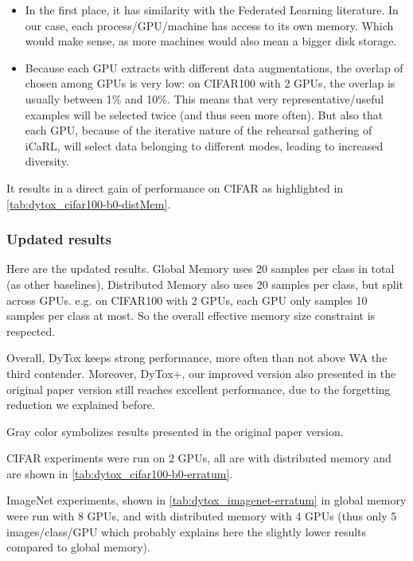 \begin{itemize}
    \item In the first place, it has similarity with the Federated Learning literature. In our case, each process/GPU/machine has access to its own memory. Which would make sense, as more machines would also mean a bigger disk storage.
    \item Because each GPU extracts with different data augmentations, the overlap of chosen among GPUs is very low: on CIFAR100 with 2 GPUs, the overlap is usually between 1\% and 10\%. This means that very representative/useful examples will be selected twice (and thus seen more often). But also that each GPU, because of the iterative nature of the rehearsal gathering of iCaRL, will select data belonging to different modes, leading to increased diversity.
\end{itemize}

It results in a direct gain of performance on CIFAR as highlighted in \autoref{tab:dytox_cifar100-b0-distMem}.



\subsubsection{Updated results}

Here are the updated results. Global Memory uses 20 samples per class in total (as other baselines), Distributed Memory also uses 20 samples per class, but split across GPUs. e.g. on CIFAR100 with 2 GPUs, each GPU only samples 10 samples per class at most. So the overall effective memory size constraint is respected.

Overall, DyTox keeps strong performance, more often than not above WA \citep{zhao2020weightalignement} the third contender. Moreover, DyTox+, our improved version also presented in the original paper version still reaches excellent performance, due to the forgetting reduction we explained before.

Gray color symbolizes results presented in the original paper version.

CIFAR experiments were run on 2 GPUs, all are with distributed memory and are shown in \autoref{tab:dytox_cifar100-b0-erratum}.

ImageNet experiments, shown in \autoref{tab:dytox_imagenet-erratum} in global memory were run with 8 GPUs, and with distributed memory with 4 GPUs (thus only 5 images/class/GPU which probably explains here the slightly lower results compared to global memory).





